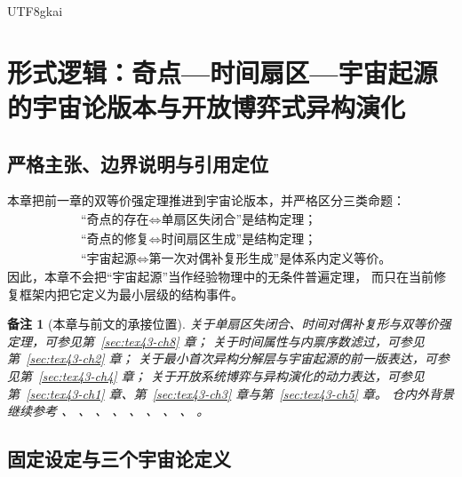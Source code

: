 \documentclass[12pt]{article}
\newtheorem{remark}{备注}[section]
\begin{document}
\begin{CJK*}{UTF8}{gkai}
\clearpage

\section{形式逻辑：奇点—时间扇区—宇宙起源的宇宙论版本与开放博弈式异构演化}
\label{sec:tex43-ch9}

\subsection{严格主张、边界说明与引用定位}
\label{subsec:tex43-ch9-convention}

本章把前一章的双等价强定理推进到宇宙论版本，并严格区分三类命题：
\[
  \boxed{
    \begin{aligned}
      &\text{“奇点的存在}\iff\text{单扇区失闭合”是结构定理；}\\
      &\text{“奇点的修复}\iff\text{时间扇区生成”是结构定理；}\\
      &\text{“宇宙起源}\iff\text{第一次对偶补复形生成”是体系内定义等价。}
    \end{aligned}
  }
\]
因此，本章不会把“宇宙起源”当作经验物理中的无条件普遍定理，
而只在当前修复框架内把它定义为最小层级的结构事件。

\begin{remark}[本章与前文的承接位置]
关于单扇区失闭合、时间对偶补复形与双等价强定理，可参见第~\ref{sec:tex43-ch8} 章；
关于时间属性与内禀序数滤过，可参见第~\ref{sec:tex43-ch2} 章；
关于最小首次异构分解层与宇宙起源的前一版表达，可参见第~\ref{sec:tex43-ch4} 章；
关于开放系统博弈与异构演化的动力表达，可参见第~\ref{sec:tex43-ch1} 章、第~\ref{sec:tex43-ch3} 章与第~\ref{sec:tex43-ch5} 章。
仓内外背景继续参考
\cite{RepoTex23OpenSystemGame}、
\cite{RepoTex29RepairableObstruction}、
\cite{RepoTex38JacobiBianchiRepair}、
\cite{RepoTex39StatRepair}、
\cite{GaoZheng2025GFramework}、
\cite{Weibel1994HomologicalAlgebra}、
\cite{Hatcher2002AT}、
\cite{Jech2003SetTheory}、
\cite{Kunen2011SetTheory}。
\end{remark}

\subsection{固定设定与三个宇宙论定义}
\label{subsec:tex43-ch9-definitions}


\end{CJK*}
\end{document}
